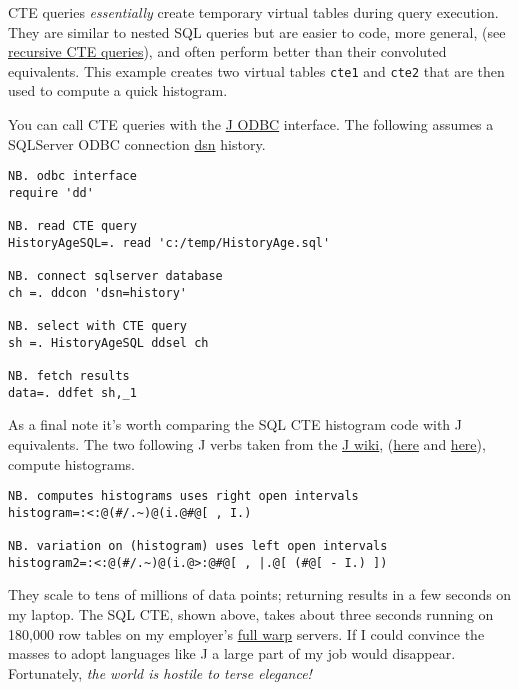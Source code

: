 CTE queries \emph{essentially} create temporary virtual tables during
query execution. They are similar to nested SQL queries but are easier
to code, more general, (see
\href{http://msdn.microsoft.com/en-us/library/ms186243.aspx}{recursive
CTE queries}), and often perform better than their convoluted
equivalents. This example creates two virtual tables \texttt{cte1} and \texttt{cte2} that
are then used to compute a quick histogram.

You can call CTE queries with the
\href{http://www.jsoftware.com/jwiki/ODBC}{J ODBC} interface. The
following assumes a SQLServer ODBC connection
\href{http://www.geeksengine.com/article/mysql-odbc.html}{dsn} history.

\begin{lstlisting}[language=jdoc, frame=single,framerule=0pt,label=lst:scr1795X1]
NB. odbc interface
require 'dd'

NB. read CTE query
HistoryAgeSQL=. read 'c:/temp/HistoryAge.sql'

NB. connect sqlserver database
ch =. ddcon 'dsn=history'

NB. select with CTE query
sh =. HistoryAgeSQL ddsel ch

NB. fetch results
data=. ddfet sh,_1
\end{lstlisting}

As a final note it's worth comparing the SQL CTE histogram code with J
equivalents. The two following J verbs taken from the
\href{http://www.jsoftware.com/jwiki/FrontPage}{J wiki},
(\href{http://www.jsoftware.com/jwiki/Essays/Histogram}{here} and
\href{http://www.jsoftware.com/jwiki/BrianSchott/Histogram}{here}),
compute histograms.


\begin{lstlisting}[language=jdoc, frame=single,framerule=0pt,label=lst:scr1795X2]
NB. computes histograms uses right open intervals
histogram=:<:@(#/.~)@(i.@#@[ , I.)

NB. variation on (histogram) uses left open intervals
histogram2=:<:@(#/.~)@(i.@>:@#@[ , |.@[ (#@[ - I.) ])
\end{lstlisting}

They scale to tens of millions of data points; returning results in a
few seconds on my laptop. The SQL CTE, shown above, takes about three
seconds running on 180,000 row tables on my employer's
\href{http://www.trekmania.net/science/warp\_scale.htm}{full warp}
servers. If I could convince the masses to adopt languages like J a
large part of my job would disappear. Fortunately, \emph{the world is
hostile to terse elegance!}



%